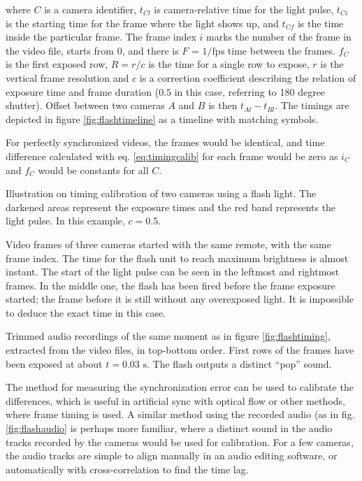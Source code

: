 where $C$ is a camera identifier, $t_{Cl}$ is camera-relative time for the light pulse, $t_{Ci}$ is the starting time for the frame where the light shows up, and $t_{Cf}$ is the time inside the particular frame.
The frame index $i$ marks the number of the frame in the video file, starts from 0, and there is $F$ = $1/\text{fps}$ time between the frames.
$f_C$ is the first exposed row, $R = r / c$ is the time for a single row to expose, $r$ is the vertical frame resolution and $c$ is a correction coefficient describing the relation of exposure time and frame duration ($0.5$ in this case, referring to 180 degree shutter).
Offset between two cameras $A$ and $B$ is then $t_{Al} - t_{Bl}$.
The timings are depicted in figure \ref{fig:flashtimeline} as a timeline with matching symbols.

For perfectly synchronized videos, the frames would be identical, and time difference calculated with eq. \ref{eq:timingcalib} for each frame would be zero as $i_C$ and $f_C$ would be constants for all $C$.

{Illustration on timing calibration of two cameras using a flash light.
The darkened areas represent the exposure times and the red band represents the light pulse.
In this example, $c = 0.5$.
}

{Video frames of three cameras started with the same remote, with the same frame index.
The time for the flash unit to reach maximum brightness is almost instant.
The start of the light pulse can be seen in the leftmost and rightmost frames.
In the middle one, the flash has been fired before the frame exposure started;
the frame before it is still without any overexposed light.
It is impossible to deduce the exact time in this case.
}

{Trimmed audio recordings of the same moment as in figure \ref{fig:flashtiming}, extracted from the video files, in top-bottom order.
First rows of the frames have been exposed at about $t = 0.03 \text{ s}$.
The flash outputs a distinct ``pop'' sound.
}


The method for measuring the synchronization error can be used to calibrate the differences, which is useful in artificial sync with optical flow or other methods, where frame timing is used.
A similar method using the recorded audio (as in fig. \ref{fig:flashaudio} is perhaps more familiar, where a distinct sound in the audio tracks recorded by the cameras would be used for calibration.
For a few cameras, the audio tracks are simple to align manually in an audio editing software, or automatically with cross-correlation to find the time lag.

